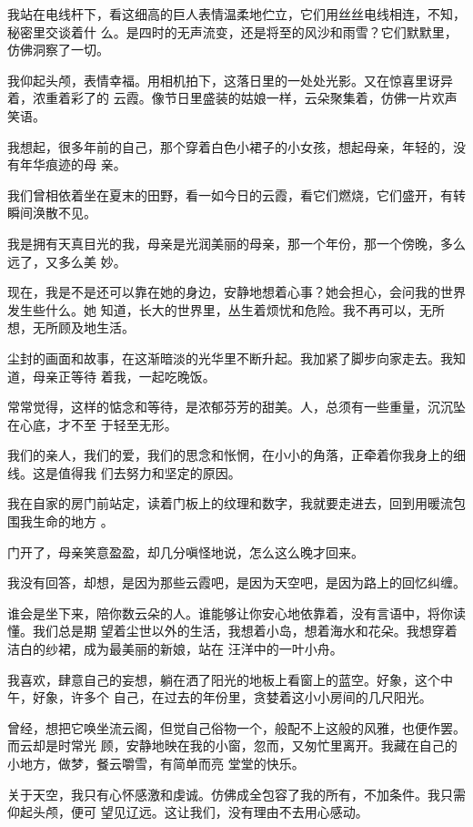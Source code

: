 \documentclass[12pt,a4paper]{article}
\begin{document}
		我站在电线杆下，看这细高的巨人表情温柔地伫立，它们用丝丝电线相连，不知，秘密里交谈着什
	么。是四时的无声流变，还是将至的风沙和雨雪？它们默默里，仿佛洞察了一切。


		我仰起头颅，表情幸福。用相机拍下，这落日里的一处处光影。又在惊喜里讶异着，浓重着彩了的
	云霞。像节日里盛装的姑娘一样，云朵聚集着，仿佛一片欢声笑语。

		我想起，很多年前的自己，那个穿着白色小裙子的小女孩，想起母亲，年轻的，没有年华痕迹的母
	亲。

		我们曾相依着坐在夏末的田野，看一如今日的云霞，看它们燃烧，它们盛开，有转瞬间涣散不见。

		我是拥有天真目光的我，母亲是光润美丽的母亲，那一个年份，那一个傍晚，多么远了，又多么美
	妙。

		现在，我是不是还可以靠在她的身边，安静地想着心事？她会担心，会问我的世界发生些什么。她
	知道，长大的世界里，丛生着烦忧和危险。我不再可以，无所想，无所顾及地生活。


		尘封的画面和故事，在这渐暗淡的光华里不断升起。我加紧了脚步向家走去。我知道，母亲正等待
	着我，一起吃晚饭。

		常常觉得，这样的惦念和等待，是浓郁芬芳的甜美。人，总须有一些重量，沉沉坠在心底，才不至
	于轻至无形。

		我们的亲人，我们的爱，我们的思念和怅惘，在小小的角落，正牵着你我身上的细线。这是值得我
	们去努力和坚定的原因。

		我在自家的房门前站定，读着门板上的纹理和数字，我就要走进去，回到用暖流包围我生命的地方
	。

		门开了，母亲笑意盈盈，却几分嗔怪地说，怎么这么晚才回来。

		我没有回答，却想，是因为那些云霞吧，是因为天空吧，是因为路上的回忆纠缠。


		谁会是坐下来，陪你数云朵的人。谁能够让你安心地依靠着，没有言语中，将你读懂。我们总是期
	望着尘世以外的生活，我想着小岛，想着海水和花朵。我想穿着洁白的纱裙，成为最美丽的新娘，站在
	汪洋中的一叶小舟。


		我喜欢，肆意自己的妄想，躺在洒了阳光的地板上看窗上的蓝空。好象，这个中午，好象，许多个
	自己，在过去的年份里，贪婪着这小小房间的几尺阳光。

		曾经，想把它唤坐流云阁，但觉自己俗物一个，般配不上这般的风雅，也便作罢。而云却是时常光
	顾，安静地映在我的小窗，忽而，又匆忙里离开。我藏在自己的小地方，做梦，餐云嚼雪，有简单而亮
	堂堂的快乐。


		关于天空，我只有心怀感激和虔诚。仿佛成全包容了我的所有，不加条件。我只需仰起头颅，便可
	望见辽远。这让我们，没有理由不去用心感动。
\end{document}
